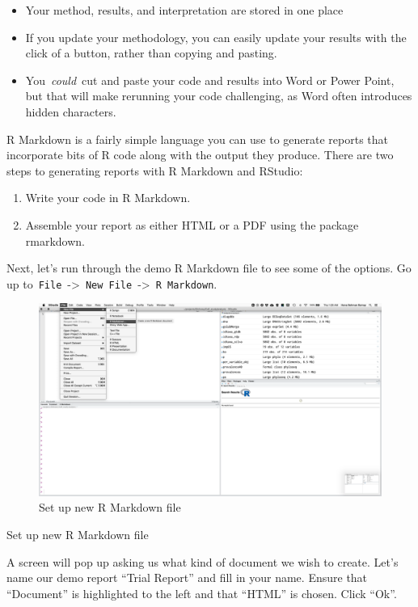 \documentclass[
]{book}
\providecommand{\tightlist}{%
  \setlength{\itemsep}{0pt}\setlength{\parskip}{0pt}}
\begin{document}
\begin{itemize}
\item
  Your method, results, and interpretation are stored in one place
\item
  If you update your methodology, you can easily update your results with the click of a button, rather than copying and pasting.
\item
  You~\emph{could}~cut and paste your code and results into Word or Power Point, but that will make rerunning your code challenging, as Word often introduces hidden characters.
\end{itemize}

R Markdown is a fairly simple language you can use to generate reports that incorporate bits of R code along with the output they produce. There are two steps to generating reports with R Markdown and RStudio:

\begin{enumerate}
\def\labelenumi{\arabic{enumi}.}
\tightlist
\item
  Write your code in R Markdown.
\item
  Assemble your report as either HTML or a PDF using the package rmarkdown.
\end{enumerate}

Next, let's run through the demo R Markdown file to see some of the options. Go up to~\texttt{File}~-\textgreater~\texttt{New\ File}~-\textgreater~\texttt{R\ Markdown}.

\begin{figure}
\centering
\includegraphics{img/markdown.png}
\caption{Set up new R Markdown file}
\end{figure}

Set up new R Markdown file

A screen will pop up asking us what kind of document we wish to create. Let's name our demo report ``Trial Report'' and fill in your name. Ensure that ``Document'' is highlighted to the left and that ``HTML'' is chosen. Click ``Ok''.
\end{document}
